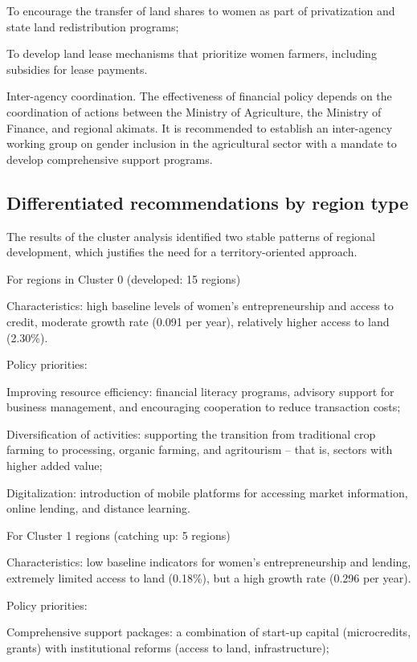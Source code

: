 ﻿\documentclass[sn-mathphys-num]{sn-jnl}
\begin{document}
To encourage the transfer of land shares to women as part of
privatization and state land redistribution programs;

To develop land lease mechanisms that prioritize women farmers,
including subsidies for lease payments.

Inter-agency coordination. The effectiveness of financial policy depends
on the coordination of actions between the Ministry of Agriculture, the
Ministry of Finance, and regional akimats. It is recommended to
establish an inter-agency working group on gender inclusion in the
agricultural sector with a mandate to develop comprehensive support
programs.

\subsection{Differentiated recommendations by region type}

The results of the cluster analysis identified two stable patterns of
regional development, which justifies the need for a territory-oriented
approach.

For regions in Cluster 0 (developed: 15 regions)

Characteristics: high baseline levels of women's entrepreneurship and
access to credit, moderate growth rate (0.091 per year), relatively
higher access to land (2.30\%).

Policy priorities:

Improving resource efficiency: financial literacy programs, advisory
support for business management, and encouraging cooperation to reduce
transaction costs;

Diversification of activities: supporting the transition from
traditional crop farming to processing, organic farming, and agritourism
-- that is, sectors with higher added value;

Digitalization: introduction of mobile platforms for accessing market
information, online lending, and distance learning.

For Cluster 1 regions (catching up: 5 regions)

Characteristics: low baseline indicators for women's entrepreneurship
and lending, extremely limited access to land (0.18\%), but a high
growth rate (0.296 per year).

Policy priorities:

Comprehensive support packages: a combination of start-up capital
(microcredits, grants) with institutional reforms (access to land,
infrastructure);
\end{document}
